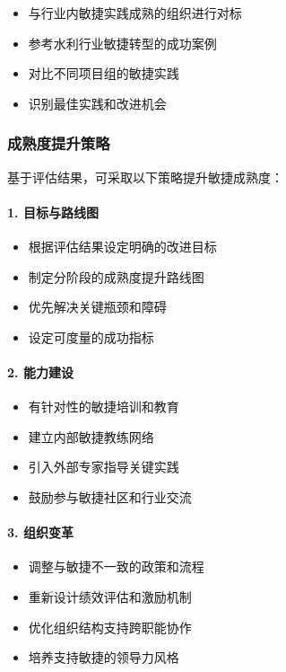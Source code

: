 \begin{itemize}
\tightlist
\item
  与行业内敏捷实践成熟的组织进行对标
\item
  参考水利行业敏捷转型的成功案例
\item
  对比不同项目组的敏捷实践
\item
  识别最佳实践和改进机会
\end{itemize}

\subsubsection{成熟度提升策略}\label{ux6210ux719fux5ea6ux63d0ux5347ux7b56ux7565}

基于评估结果，可采取以下策略提升敏捷成熟度：

\paragraph{1. 目标与路线图}\label{ux76eeux6807ux4e0eux8defux7ebfux56fe}

\begin{itemize}
\tightlist
\item
  根据评估结果设定明确的改进目标
\item
  制定分阶段的成熟度提升路线图
\item
  优先解决关键瓶颈和障碍
\item
  设定可度量的成功指标
\end{itemize}

\paragraph{2. 能力建设}\label{ux80fdux529bux5efaux8bbe}

\begin{itemize}
\tightlist
\item
  有针对性的敏捷培训和教育
\item
  建立内部敏捷教练网络
\item
  引入外部专家指导关键实践
\item
  鼓励参与敏捷社区和行业交流
\end{itemize}

\paragraph{3. 组织变革}\label{ux7ec4ux7ec7ux53d8ux9769}

\begin{itemize}
\tightlist
\item
  调整与敏捷不一致的政策和流程
\item
  重新设计绩效评估和激励机制
\item
  优化组织结构支持跨职能协作
\item
  培养支持敏捷的领导力风格
\end{itemize}

